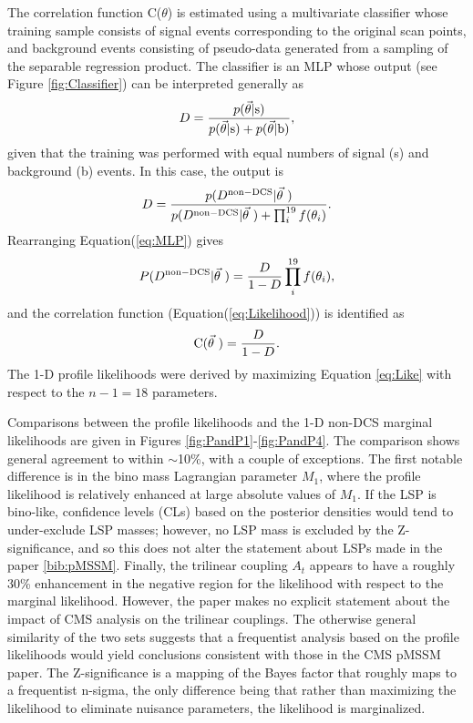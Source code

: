 The correlation function C($\theta$) is estimated using a multivariate classifier whose training sample consists of signal events corresponding to the original scan points, and background events consisting of pseudo-data generated from a sampling of the separable regression product. The classifier is an MLP whose output (see Figure \ref{fig:Classifier}) can be interpreted generally as
\begin{equation}
D = \frac{p(\vec{\theta} | {\rm s})}{p(\vec{\theta} | {\rm s})+p(\vec{\theta} | {\rm b})},
\label{eq:mlp}
\end{equation}
given that the training was performed with equal numbers of signal (s) and background (b) events. In this case, the output is
\begin{equation}
D = \frac{p(D^{\rm non-DCS}|\vec{\theta}\ )}{p(D^{\rm non-DCS}|\vec{\theta}\ )+ \prod_{i}^{19}f(\theta_{i})}.
\label{eq:MLP}
\end{equation}
Rearranging Equation(\ref{eq:MLP}) gives
\begin{equation}
P(D^{\rm non-DCS}|\vec{\theta}\ ) = \frac{D}{1-D}\prod_{i}^{19}f(\theta_{i}),
\label{eq:Like}
\end{equation}
and the correlation function (Equation(\ref{eq:Likelihood})) is identified as
\begin{equation}
{\rm C}(\vec{\theta}\ ) = \frac{D}{1-D}.
\end{equation}
The 1-D profile likelihoods were derived by maximizing Equation \ref{eq:Like} with respect to the $n-1=18$ parameters. 

Comparisons between the profile likelihoods and the 1-D non-DCS  marginal likelihoods are given in Figures \ref{fig:PandP1}-\ref{fig:PandP4}.  The comparison shows general agreement to within $\sim$10\%, with a couple of exceptions. The first notable difference is in the bino mass Lagrangian parameter $M_1$, where the profile likelihood is relatively enhanced at large absolute values of $M_1$. If the LSP is bino-like,  confidence levels (CLs) based on the posterior densities would tend to under-exclude LSP masses; however, no LSP mass is excluded by the Z-significance, and so this does not alter the statement about LSPs made in the paper \ref{bib:pMSSM}. Finally, the trilinear coupling $A_t$ appears to have a roughly 30\% enhancement in the negative region for the likelihood with respect to the marginal likelihood. However, the paper makes no explicit statement about the impact of CMS analysis on the trilinear couplings. The otherwise general similarity of the two sets suggests that a frequentist analysis based on the profile likelihoods would yield conclusions consistent with those in the CMS pMSSM paper.  The Z-significance is a mapping of the Bayes factor that roughly maps to a frequentist n-sigma, the only difference being that rather than maximizing the likelihood to eliminate nuisance parameters, the likelihood is marginalized. 

